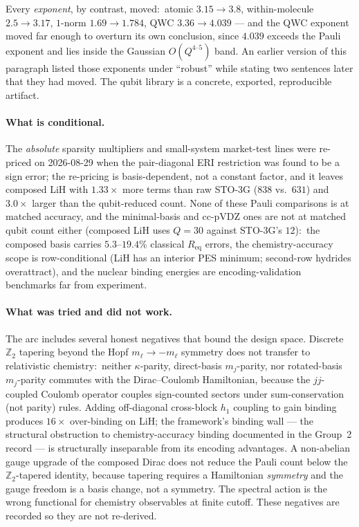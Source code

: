 \documentclass[aps,pra,twocolumn,superscriptaddress,longbibliography]{revtex4-2}
\newcommand{\gvq}[2]{#2}
\begin{document}
Every \emph{exponent}, by contrast, moved:\ atomic $3.15 \to 3.8$,
within-molecule $2.5 \to 3.17$, $1$-norm $1.69 \to \gvq{exp_lambda_4pt}{1.784}$, QWC
$3.36 \to \gvq{exp_qwc_3pt}{4.039}$ --- and the QWC exponent moved far enough to overturn its
own conclusion, since $\gvq{exp_qwc_3pt}{4.039}$ exceeds the Pauli exponent and lies inside
the Gaussian $O(Q^{4\text{--}5})$ band.  An earlier version of this
paragraph listed those exponents under ``robust'' while stating two
sentences later that they had moved.  The qubit
library is a concrete, exported, reproducible artifact.

\paragraph{What is conditional.}
The \emph{absolute} sparsity multipliers and small-system market-test
lines were re-priced on 2026-08-29 when the pair-diagonal ERI restriction
was found to be a sign error; the re-pricing is basis-dependent, not a
constant factor, and it leaves composed LiH with $1.33\times$ more terms than raw
STO-3G ($838$ vs.\ $\gvq{lih_sto3g_raw}{631}$) and $3.0\times$ larger than the qubit-reduced
count.  None of these Pauli comparisons is at matched accuracy, and
the minimal-basis and cc-pVDZ ones are not at matched qubit count
either (composed LiH uses $Q=30$ against STO-3G's $12$):\ the composed basis carries $5.3$--$19.4\%$ classical
$R_{\mathrm{eq}}$ errors, the chemistry-accuracy scope is row-conditional
(LiH has an interior PES minimum; second-row hydrides overattract), and the nuclear binding
energies are encoding-validation benchmarks far from experiment.

\paragraph{What was tried and did not work.}
The arc includes several honest negatives that bound the design space.
Discrete $\mathbb{Z}_2$ tapering beyond the Hopf $m_\ell \to -m_\ell$
symmetry does not transfer to relativistic chemistry:\ neither
$\kappa$-parity, direct-basis $m_j$-parity, nor rotated-basis
$m_j$-parity commutes with the Dirac--Coulomb Hamiltonian, because the
$jj$-coupled Coulomb operator couples sign-counted sectors under
sum-conservation (not parity) rules.  Adding off-diagonal cross-block
$h_1$ coupling to gain binding produces $16\times$ over-binding on LiH;
the framework's binding wall --- the structural obstruction to
chemistry-accuracy binding documented in the Group~2 record --- is
structurally inseparable from its
encoding advantages.  A non-abelian gauge upgrade of the composed Dirac
does not reduce the Pauli count below the $\mathbb{Z}_2$-tapered
identity, because tapering requires a Hamiltonian \emph{symmetry} and the
gauge freedom is a basis change, not a symmetry.  The spectral action is
the wrong functional for chemistry observables at finite cutoff.  These
negatives are recorded so they are not re-derived.
\end{document}
